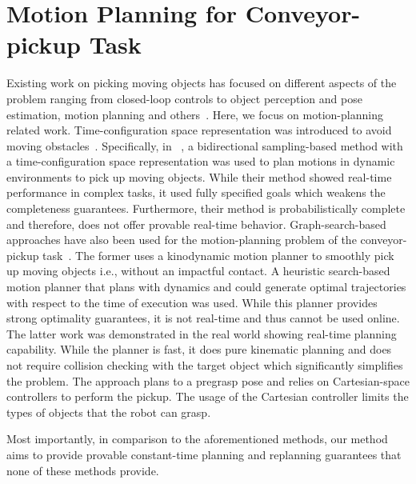 \documentclass[a4paper]{report}
\begin{document}
\section{Motion Planning for Conveyor-pickup Task}
Existing work on picking moving objects has focused on different aspects of the problem ranging from closed-loop controls to object perception and pose estimation, motion planning and others~\cite{allen1993automated, han2019toward, stogl2017tracking, zhang2018gilbreth}. 
%
Here, we focus on motion-planning related work. Time-configuration space representation was introduced to avoid moving obstacles~\cite{fraichard1993dynamic,cefalo2013task,yang2018planning}. Specifically, in ~\cite{yang2018planning}, a bidirectional sampling-based method with a time-configuration space representation was used to plan motions in dynamic environments to pick up moving objects. While their method showed real-time performance in complex tasks, it used fully specified goals which weakens the completeness guarantees. Furthermore, their method is probabilistically complete and therefore, does not offer provable real-time behavior. Graph-search-based approaches have also been used for the motion-planning problem of the conveyor-pickup task~\cite{cowley2013perception, menon2014motion}. The former uses a kinodynamic motion planner to smoothly pick up moving objects i.e., without an impactful contact. A heuristic search-based motion planner that plans with dynamics and could generate optimal trajectories with respect to the time of execution was used. While this planner provides strong optimality guarantees, it is not real-time and thus cannot be used online.
%
The latter work was demonstrated in the real world showing real-time planning capability. While the planner is fast, it does pure kinematic planning and does not require collision checking with the target object which significantly simplifies the problem. The approach plans to a pregrasp pose and relies on Cartesian-space controllers to perform the pickup. The usage of the Cartesian controller limits the types of objects that the robot can grasp.

Most importantly, in comparison to the aforementioned methods, our method aims to provide provable constant-time planning and replanning guarantees that none of these methods provide.
\end{document}
